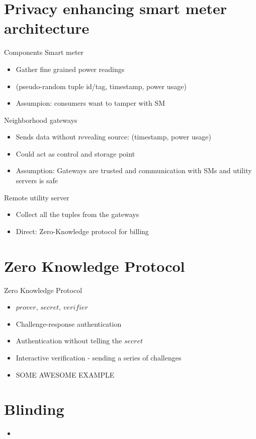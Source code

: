 \documentclass[10pt]{beamer}
\begin{document}
\section{Privacy enhancing smart meter architecture}
\begin{frame}{Components}
  Smart meter
  \begin{itemize}
  \item Gather fine grained power readings
  \item (pseudo-random tuple id/tag, timestamp, power usage)
  \item Assumpion: consumers want to tamper with SM
  \end{itemize}
  \pause
  Neighborhood gateways
  \begin{itemize}
  \item Sends data without revealing source: (timestamp, power usage)
  \item Could act as control and storage point
  \item Assumption: Gateways are trusted and communication with SMs and utility servers is safe
  \end{itemize}
  \pause
  Remote utility server
  \begin{itemize}
  \item Collect all the tuples from the gateways
  \item Direct: Zero-Knowledge protocol for billing
  \end{itemize}
\end{frame}
%
\section{Zero Knowledge Protocol}
\begin{frame}{Zero Knowledge Protocol}
  \begin{itemize}
  \item $prover$, $secret$, $verifier$
  \item Challenge-response authentication
  \item Authentication without telling the $secret$
  \item Interactive verification - sending a series of challenges
  \item SOME AWESOME EXAMPLE
  \end{itemize}
\end{frame}

\section{Blinding}
\begin{frame}
  \begin{itemize}
  \item 
  \end{itemize}
\end{frame}
\end{document}
